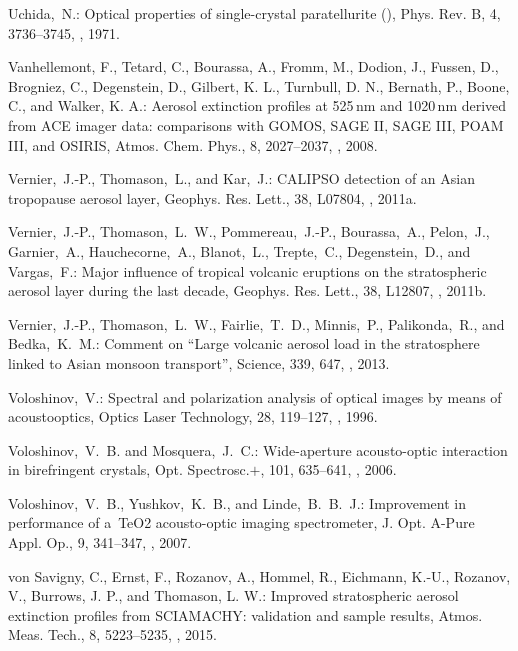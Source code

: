 \documentclass[amt]{copernicus}
\begin{document}
\begin{thebibliography}{99}
Uchida,~N.: Optical properties of single-crystal paratellurite
(), Phys. Rev. B, 4, 3736--3745,
,
1971.


Vanhellemont, F., Tetard, C., Bourassa, A., Fromm, M., Dodion, J., Fussen,
D., Brogniez, C., Degenstein, D., Gilbert, K. L., Turnbull, D. N., Bernath,
P., Boone, C., and Walker, K. A.: Aerosol extinction profiles at 525\,nm and
1020\,nm derived from ACE imager data: comparisons with GOMOS, SAGE II, SAGE
III, POAM III, and OSIRIS, Atmos. Chem. Phys., 8, 2027--2037,
, 2008.


Vernier,~J.-P., Thomason,~L., and Kar,~J.: CALIPSO detection of an Asian
tropopause aerosol layer, Geophys. Res. Lett., 38, L07804,
, 2011a.


Vernier,~J.-P., Thomason,~L.~W., Pommereau,~J.-P., Bourassa,~A., Pelon,~J.,
Garnier,~A., Hauchecorne,~A., Blanot,~L., Trepte,~C., Degenstein,~D., and
Vargas,~F.: Major influence of tropical volcanic eruptions on the
stratospheric aerosol layer during the last decade, Geophys. Res. Lett., 38,
L12807,
,
2011b.


Vernier,~J.-P., Thomason,~L.~W., Fairlie,~T.~D., Minnis,~P., Palikonda,~R.,
and Bedka,~K.~M.: Comment on ``Large volcanic aerosol load in the
stratosphere linked to Asian monsoon transport'', Science, 339, 647,
,
2013.


Voloshinov,~V.: Spectral and polarization analysis of optical images by means
of acoustooptics, Optics Laser Technology, 28, 119--127,
,
1996.


Voloshinov,~V.~B. and Mosquera,~J.~C.: Wide-aperture acousto-optic
interaction in birefringent crystals, Opt. Spectrosc.$+$, 101, 635--641,
,
2006.


Voloshinov,~V.~B., Yushkov,~K.~B., and Linde,~B.~B.~J.: Improvement in
performance of a~TeO2 acousto-optic imaging spectrometer, J. Opt. A-Pure
Appl. Op., 9, 341--347,
,
2007.


von Savigny, C., Ernst, F., Rozanov, A., Hommel, R., Eichmann, K.-U.,
Rozanov, V., Burrows, J. P., and Thomason, L. W.: Improved stratospheric
aerosol extinction profiles from SCIAMACHY: validation and sample results,
Atmos. Meas. Tech., 8, 5223--5235, ,
2015.



\end{thebibliography}
\end{document}
